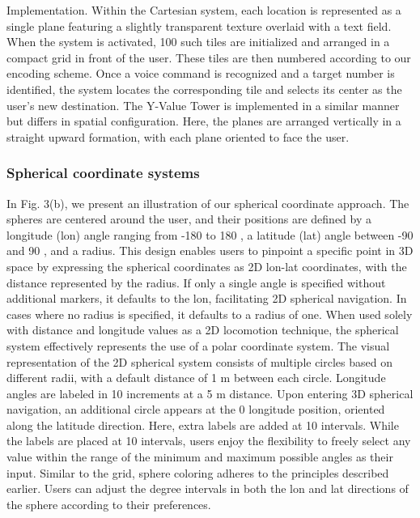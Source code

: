 \documentclass[preprint,12pt]{elsarticle}
\newcommand{\reftext}[1]{{\color{gray}#1}}   %
\begin{document}
\reftext{Implementation. Within the Cartesian system, each location is represented as a single plane featuring a slightly transparent texture overlaid with a text field. When the system is activated, 100 such tiles are initialized and arranged in a compact grid in front of the user. These tiles are then numbered according to our encoding scheme. Once a voice command is recognized and a target number is identified, the system locates the corresponding tile and selects its center as the user's new destination. The Y-Value Tower is implemented in a similar manner but differs in spatial configuration. Here, the planes are arranged vertically in a straight upward formation, with each plane oriented to face the user.}

\subsubsection{Spherical coordinate systems}
\reftext{In Fig. 3(b), we present an illustration of our spherical coordinate approach. The spheres are centered around the user, and their positions are defined by a longitude (lon) angle ranging from -180 to 180 , a latitude (lat) angle between -90 and 90 , and a radius. This design enables users to pinpoint a specific point in 3D space by expressing the spherical coordinates as 2D lon-lat coordinates, with the distance represented by the radius. If only a single angle is specified without additional markers, it defaults to the lon, facilitating 2D spherical navigation. In cases where no radius is specified, it defaults to a radius of one. When used solely with distance and longitude values as a 2D locomotion technique, the spherical system effectively represents the use of a polar coordinate system. The visual representation of the 2D spherical system consists of multiple circles based on different radii, with a default distance of 1 m between each circle. Longitude angles are labeled in 10 increments at a 5 m distance. Upon entering 3D spherical navigation, an additional circle appears at the 0 longitude position, oriented along the latitude direction. Here, extra labels are added at 10 intervals. While the labels are placed at 10 intervals, users enjoy the flexibility to freely select any value within the range of the minimum and maximum possible angles as their input. Similar to the grid, sphere coloring adheres to the principles described earlier. Users can adjust the degree intervals in both the lon and lat directions of the sphere according to their preferences.}
\end{document}
